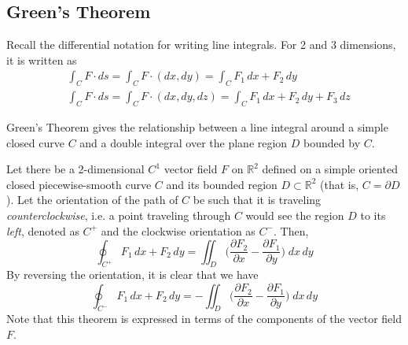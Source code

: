 \subsection{Green's Theorem}
		
  Recall the differential notation for writing line integrals. For 2 and 3 dimensions, it is written as
  \begin{align}
		& \int_C F \cdot d s = \int_C F \cdot (d x, d y) = \int_C F_1 \, d x + F_2 \, d y \\
		& \int_C F \cdot d s = \int_C F \cdot (d x, d y, d z) = \int_C F_1 \, d x + F_2 \, d y + F_3 \, d z 
  \end{align}
		
  Green's Theorem gives the relationship between a line integral around a simple closed curve $C$ and a double integral over the plane region $D$ bounded by $C$. 
		
  \begin{theorem}
    \label{thm:greens-theorem-in-r2}
		Let there be a 2-dimensional $C^1$ vector field $F$ on $\mathbb{R}^2$ defined on a simple oriented closed piecewise-smooth curve $C$ and its bounded region $D \subset \mathbb{R}^2$ (that is, $C = \partial D$). Let the orientation of the path of $C$ be such that it is traveling \textit{counterclockwise}, i.e. a point traveling through $C$ would see the region $D$ to its \textit{left}, denoted as $C^+$ and the clockwise orientation as $C^-$.  Then, 
		\begin{equation}
			\oint_{C^+} F_1 \, d x + F_2 \, d y = \iint_D \bigg( \frac{\partial F_2}{\partial x} - \frac{\partial F_1}{\partial y} \bigg) \; d x \, d y
		\end{equation}
		By reversing the orientation, it is clear that we have
		\begin{equation}
			\oint_{C^-} F_1 \, d x + F_2 \, d y = - \iint_D \bigg( \frac{\partial F_2}{\partial x} - \frac{\partial F_1}{\partial y} \bigg) \; d x \, d y
		\end{equation}
		Note that this theorem is expressed in terms of the components of the vector field $F$. 
		\begin{center}
		\end{center}
  \end{theorem}
		
